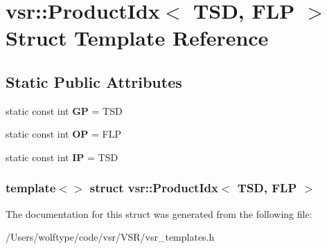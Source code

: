 \hypertarget{structvsr_1_1_product_idx_3_01_t_s_d_00_01_f_l_p_01_4}{\section{vsr\-:\-:Product\-Idx$<$ T\-S\-D, F\-L\-P $>$ Struct Template Reference}
\label{structvsr_1_1_product_idx_3_01_t_s_d_00_01_f_l_p_01_4}
}
\subsection*{Static Public Attributes}
\begin{DoxyCompactItemize}
\item 
\hypertarget{structvsr_1_1_product_idx_3_01_t_s_d_00_01_f_l_p_01_4_a7da931a10beb8f714099e99cb4b93f4f}{static const int {\bfseries G\-P} = T\-S\-D}\label{structvsr_1_1_product_idx_3_01_t_s_d_00_01_f_l_p_01_4_a7da931a10beb8f714099e99cb4b93f4f}

\item 
\hypertarget{structvsr_1_1_product_idx_3_01_t_s_d_00_01_f_l_p_01_4_a4cfb0535fc6744ba3dd43e2541d2425c}{static const int {\bfseries O\-P} = F\-L\-P}\label{structvsr_1_1_product_idx_3_01_t_s_d_00_01_f_l_p_01_4_a4cfb0535fc6744ba3dd43e2541d2425c}

\item 
\hypertarget{structvsr_1_1_product_idx_3_01_t_s_d_00_01_f_l_p_01_4_aa2571c7a92db6232a61ccdfbe53d9ca3}{static const int {\bfseries I\-P} = T\-S\-D}\label{structvsr_1_1_product_idx_3_01_t_s_d_00_01_f_l_p_01_4_aa2571c7a92db6232a61ccdfbe53d9ca3}

\end{DoxyCompactItemize}
\subsubsection*{template$<$$>$ struct vsr\-::\-Product\-Idx$<$ T\-S\-D, F\-L\-P $>$}



The documentation for this struct was generated from the following file\-:\begin{DoxyCompactItemize}
\item 
/\-Users/wolftype/code/vsr/\-V\-S\-R/vsr\-\_\-templates.\-h\end{DoxyCompactItemize}
